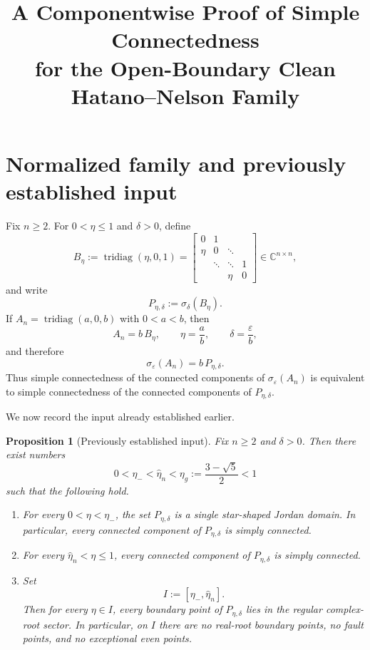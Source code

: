 \documentclass[11pt]{article}
\title{A Componentwise Proof of Simple Connectedness\\
for the Open-Boundary Clean Hatano--Nelson Family}
\author{}
\date{}
\newtheorem{proposition}[theorem]{Proposition}
\begin{document}
\maketitle

\section{Normalized family and previously established input}

Fix \(n\ge 2\).  For \(0<\eta\le 1\) and \(\delta>0\), define
\[
B_\eta:=\operatorname{tridiag}(\eta,0,1)
=
\begin{bmatrix}
0&1\\
\eta&0&\ddots\\
&\ddots&\ddots&1\\
&&\eta&0
\end{bmatrix}\in\mathbb C^{n\times n},
\]
and write
\[
P_{\eta,\delta}:=\sigma_\delta(B_\eta).
\]
If \(A_n=\operatorname{tridiag}(a,0,b)\) with \(0<a<b\), then
\[
A_n=b\,B_\eta,\qquad \eta=\frac ab,\qquad \delta=\frac{\varepsilon}{b},
\]
and therefore
\[
\sigma_\varepsilon(A_n)=b\,P_{\eta,\delta}.
\]
Thus simple connectedness of the connected components of \(\sigma_\varepsilon(A_n)\) is equivalent to simple connectedness of the connected components of \(P_{\eta,\delta}\).

We now record the input already established earlier.

\begin{proposition}[Previously established input]\label{prop:input}
Fix \(n\ge 2\) and \(\delta>0\). Then there exist numbers
\[
0<\eta_-<\widehat\eta_n<\eta_g:=\frac{3-\sqrt5}{2}<1
\]
such that the following hold.

\begin{enumerate}
\item For every \(0<\eta<\eta_-\), the set \(P_{\eta,\delta}\) is a single star-shaped Jordan domain. In particular, every connected component of \(P_{\eta,\delta}\) is simply connected.

\item For every \(\widehat\eta_n<\eta\le 1\), every connected component of \(P_{\eta,\delta}\) is simply connected.

\item Set
\[
I:=[\eta_-,\widehat\eta_n].
\]
Then for every \(\eta\in I\), every boundary point of \(P_{\eta,\delta}\) lies in the regular complex-root sector. In particular, on \(I\) there are no real-root boundary points, no fault points, and no exceptional even points.
\end{enumerate}
\end{proposition}
\end{document}
